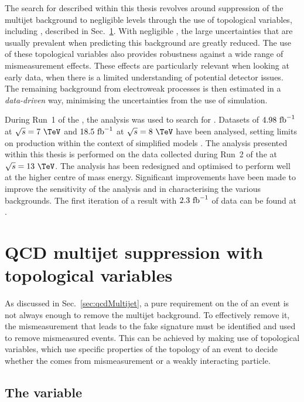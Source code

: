 The search for \SUSY described within this thesis revolves around
suppression of the \QCD multijet background to negligible levels
through the use of topological variables, including \alphat, described
in Sec.~\ref{sec:topoVars}. With negligible \QCD, the large
uncertainties that are usually prevalent when predicting this
background are greatly reduced. The use of these topological variables
also provides robustness against a wide range of mismeasurement
effects. These effects are particularly relevant when looking at early
data, when there is a limited understanding of potential detector
issues. The remaining background from electroweak processes is then
estimated in a \emph{data-driven} way, minimising the uncertainties
from the use of simulation.

During Run~1 of the \LHC, the \alphat analysis was used
to search for \SUSY. Datasets of $4.98~\text{fb}^{-1}$ at
$\sqrt{s}=7~\tev$ and $18.5~\text{fb}^{-1}$ at $\sqrt{s}=8~\tev$ have been
analysed, setting limits on \SUSY production within the context of
simplified models
\cite{Chatrchyan:2011zy,Khachatryan:2011tk,Chatrchyan:2012wa,Chatrchyan:2013mys,Khachatryan:2016pxa}.
The analysis presented within this thesis is performed on the data
collected during Run~2 of the \LHC at $\sqrt{s}=13~\tev$. The analysis
has been redesigned and optimised to perform well at the higher centre
of mass energy. Significant improvements have been made to improve the
sensitivity of the analysis and in characterising the various
backgrounds. The first iteration of a result with $2.3~\text{fb}^{-1}$ of data
can be found at \cite{CMS:2015dbr}.

\section{QCD multijet suppression with topological variables} %
\label{sec:topoVars}

As discussed in Sec.~\ref{sec:qcdMultijet}, a pure requirement on the
\MET of an event is not always enough to remove the \QCD multijet
background.  To effectively remove it, the mismeasurement that leads
to the fake \MET signature must be identified and used to remove
mismeasured events. This can be achieved by making use of topological
variables, which use specific properties of the topology of an event to
decide whether the \MET comes from mismeasurement or a weakly
interacting particle. 

\subsection{The \alphat variable}

